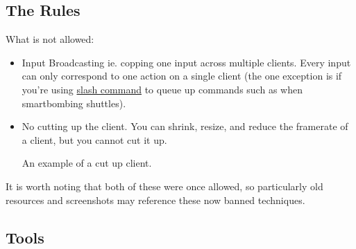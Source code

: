 \documentclass{article}
\begin{document}
\subsection{The Rules}
What is not allowed:
\begin{itemize}
  \item Input Broadcasting ie. copping one input across multiple clients. Every input can only correspond to one action
        on a single client (the one exception is if you're using \href{https://wiki.eveuniversity.org/Slash_Commands}{slash command} to 
        queue up commands such as when smartbombing shuttles).
  \item No cutting up the client. You can shrink, resize, and reduce the framerate of a client, but you cannot cut it up.
        \begin{center}
          An example of a cut up client.
        \end{center}
\end{itemize}
It is worth noting that both of these were once allowed, so particularly old resources and screenshots may reference these now banned techniques.

\subsection{Tools}
\end{document}
